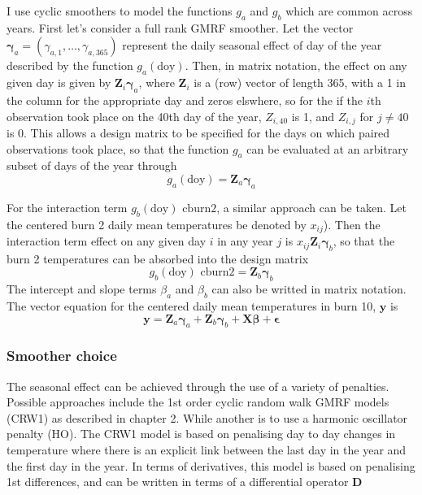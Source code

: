 I use cyclic smoothers to model the functions $g_a$ and $g_b$ which are common across years. First let's consider a full rank GMRF smoother. Let the vector $\bm{\gamma}_a = (\gamma_{a,1}, \ldots, \gamma_{a,365})$ represent the daily seasonal effect of day of the year described by the function $g_a(\text{doy})$. Then, in matrix notation, the effect on any given day is given by $\bm{Z}_i \bm{\gamma}_a$, where $\bm{Z}_i$ is a (row) vector of length 365, with a 1 in the column for the appropriate day and zeros elswhere, so for the if the $i$th observation took place on the 40th day of the year, $Z_{i,40}$ is 1, and $Z_{i,j}$ for $j \neq 40$ is 0.  This allows a design matrix to be specified for the days on which paired observations took place, so that the function $g_a$ can be evaluated at an arbitrary subset of days of the year through   
\begin{equation}
  g_a(\text{doy}) = \bm{Z}_a \bm{\gamma}_a
\end{equation}

For the interaction term $g_b(\text{doy})\text{ cburn2}$, a similar approach can be taken.
Let the centered burn 2 daily mean temperatures be denoted by $x_{ij}$).  Then the interaction term effect on any given day $i$ in any year $j$ is $x_{ij} \bm{Z}_i \bm{\gamma}_b$, so that the burn 2 temperatures can be absorbed into the design matrix
\begin{equation}
  g_b(\text{doy})\text{ cburn2} = \bm{Z}_b \bm{\gamma}_b
\end{equation}
The intercept and slope terms $\beta_a$ and $\beta_b$ can also be writted in matrix notation. The vector equation for the centered daily mean temperatures in burn 10, $\bm{y}$ is
\begin{equation}
  \bm{y} = \bm{Z}_a \bm{\gamma}_a + \bm{Z}_b \bm{\gamma}_b + \bm{X} \bm{\beta} + \bm{\epsilon}
\end{equation}




\subsubsection{Smoother choice}

The seasonal effect can be achieved through the use of a variety of penalties. Possible approaches include the 1st order cyclic random walk GMRF models (CRW1) as described in chapter 2.  While  another is to use a harmonic oscillator penalty (HO). The CRW1 model is based on penalising day to day changes in temperature where there is an explicit link between the last day in the year and the first day in the year.  In terms of derivatives, this model is based on penalising 1st differences, and can be written in terms of a differential operator $\bm{D}$

